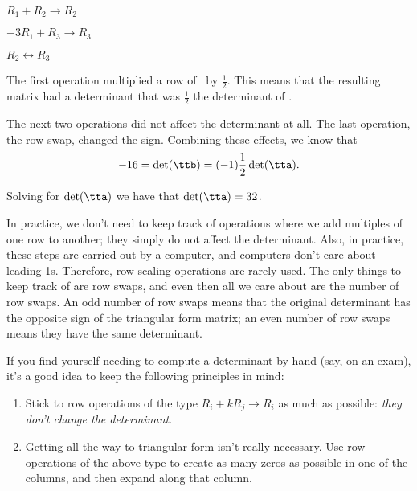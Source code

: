 {\begin{center}
$R_1 + R_2 \rightarrow R_2$

$-3R_1+R_3\rightarrow R_3$

$R_2  \leftrightarrow R_3$
\end{center}

The first operation multiplied a row of \tta\ by $\frac 12$. This means that the resulting matrix had a determinant that was $\frac12$ the determinant of \tta. 

The next two operations did not affect the determinant at all. The last operation, the row swap, changed the sign. Combining these effects, we know that 
\[
-16 = \det(\ttb)= (-1)\frac12\det(\tta).
\]

Solving for $\det(\tta)$ we have that $\det(\tta)=32$. \
}

\medskip

In practice, we don't need to keep track of operations where we add multiples of one row to another; they simply do not affect the determinant. Also, in practice, these steps are carried out by a computer, and computers don't care about leading 1s. Therefore, row scaling operations are rarely used. The only things to keep track of are row swaps, and even then all we care about are the number of row swaps. An odd number of row swaps means that the original determinant has the opposite sign of the triangular form matrix; an even number of row swaps means they have the same determinant.

If you find yourself needing to compute a determinant by hand (say, on an exam), it's a good idea to keep the following principles in mind:
\begin{enumerate}
\item Stick to row operations of the type $R_i+kR_j\to R_i$ as much as possible: \textit{they don't change the determinant}.
\item Getting all the way to triangular form isn't really necessary. Use row operations of the above type to create as many zeros as possible in one of the columns, and then expand along that column.
\end{enumerate}


